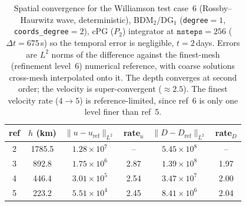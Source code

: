 
\begin{table}[htbp]
  \centering
  \begin{tabular}{c c c c c c}
    \toprule
    ref & $h$ (km) & $\|u-u_{\mathrm{ref}}\|_{L^2}$ & rate$_u$
        & $\|D-D_{\mathrm{ref}}\|_{L^2}$ & rate$_D$ \\
    \midrule
    2 & 1785.5 & $1.28\times10^{7}$ & --   & $5.45\times10^{8}$ & --   \\
    3 &  892.8 & $1.75\times10^{6}$ & 2.87 & $1.39\times10^{8}$ & 1.97 \\
    4 &  446.4 & $3.01\times10^{5}$ & 2.54 & $3.47\times10^{7}$ & 2.00 \\
    5 &  223.2 & $5.51\times10^{4}$ & 2.45 & $8.41\times10^{6}$ & 2.04 \\
    \bottomrule
  \end{tabular}
  \caption{Spatial convergence for the Williamson test case~6 (Rossby--Haurwitz wave,
    deterministic), BDM$_2$/DG$_1$ (\texttt{degree}$=1$, \texttt{coords\_degree}$=2$),
    cPG ($P_2$) integrator at $\texttt{nsteps}=256$ ($\Delta t = 675$\,s) so the temporal
    error is negligible, $t = 2$\,days. Errors are $L^2$ norms of the difference against
    the finest-mesh (refinement level~6) numerical reference, with coarse solutions
    cross-mesh interpolated onto it. The depth converges at second order; the velocity is
    super-convergent ($\approx 2.5$). The finest velocity rate ($4\!\to\!5$) is
    reference-limited, since ref~6 is only one level finer than ref~5.}
  \label{tab:w6-spatial}
\end{table}

